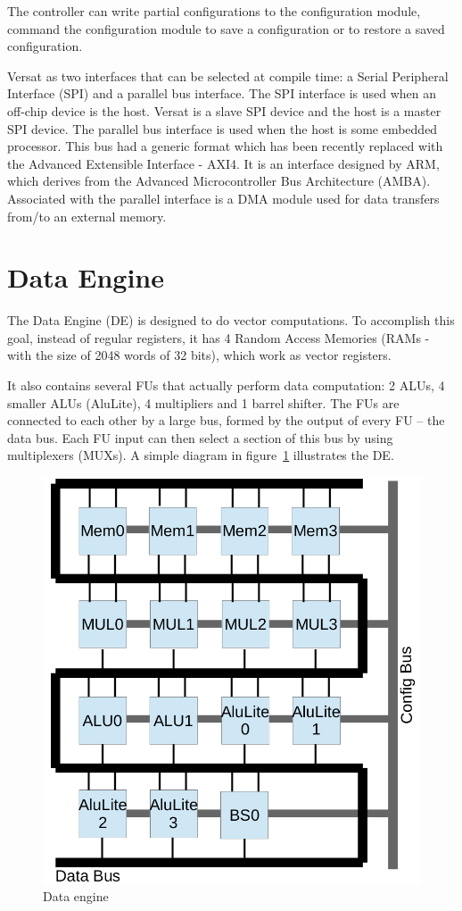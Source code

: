 The controller can write partial configurations to the configuration
module, command the configuration module to save a configuration or to
restore a saved configuration.

Versat as two interfaces that can be selected at compile time: a
Serial Peripheral Interface (SPI) and a parallel bus interface. The
SPI interface is used when an off-chip device is the host. Versat is a
slave SPI device and the host is a master SPI device. The parallel bus
interface is used when the host is some embedded processor. This bus
had a generic format which has been recently replaced with the
Advanced Extensible Interface - AXI4. It is an interface designed by
ARM, which derives from the Advanced Microcontroller Bus Architecture
(AMBA). Associated with the parallel interface is a DMA module used
for data transfers from/to an external memory.


\section{Data Engine}
\label{section:dataEngine}

The Data Engine (DE) is designed to do vector computations. To
accomplish this goal, instead of regular registers, it has 4 Random
Access Memories (RAMs - with the size of 2048 words of 32 bits),
which work as vector registers.

It also contains several FUs that actually perform data computation: 2
ALUs, 4 smaller ALUs (AluLite), 4 multipliers and 1 barrel shifter. The FUs are
connected to each other by a large bus, formed by the output of every
FU -- the data bus. Each FU input can then select a section of this
bus by using multiplexers (MUXs). A simple diagram in
figure~\ref{fig_de} illustrates the DE.

\begin{figure}[!htb]
\centering
\includegraphics[width=.5\textwidth]{drawings/de}
\caption{Data engine}
\label{fig_de}
\end{figure}

